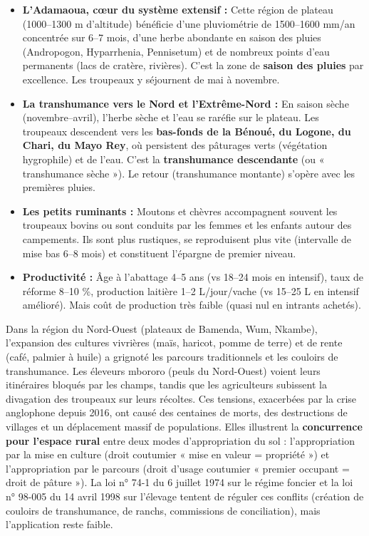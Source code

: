 \documentclass[11pt]{article}
\begin{document}
\begin{itemize}
    \item \textbf{L'Adamaoua, cœur du système extensif :} Cette région de plateau (1000--1300 m d'altitude) bénéficie d'une pluviométrie de 1500--1600 mm/an concentrée sur 6--7 mois, d'une herbe abondante en saison des pluies (Andropogon, Hyparrhenia, Pennisetum) et de nombreux points d'eau permanents (lacs de cratère, rivières). C'est la zone de \textbf{saison des pluies} par excellence. Les troupeaux y séjournent de mai à novembre.
    \item \textbf{La transhumance vers le Nord et l'Extrême-Nord :} En saison sèche (novembre--avril), l'herbe sèche et l'eau se raréfie sur le plateau. Les troupeaux descendent vers les \textbf{bas-fonds de la Bénoué, du Logone, du Chari, du Mayo Rey}, où persistent des pâturages verts (végétation hygrophile) et de l'eau. C'est la \textbf{transhumance descendante} (ou « transhumance sèche »). Le retour (transhumance montante) s'opère avec les premières pluies.
    \item \textbf{Les petits ruminants :} Moutons et chèvres accompagnent souvent les troupeaux bovins ou sont conduits par les femmes et les enfants autour des campements. Ils sont plus rustiques, se reproduisent plus vite (intervalle de mise bas 6--8 mois) et constituent l'épargne de premier niveau.
    \item \textbf{Productivité :} Âge à l'abattage 4--5 ans (vs 18--24 mois en intensif), taux de réforme 8--10 \%, production laitière 1--2 L/jour/vache (vs 15--25 L en intensif amélioré). Mais coût de production très faible (quasi nul en intrants achetés).
\end{itemize}

\begin{savaistu}
Dans la région du Nord-Ouest (plateaux de Bamenda, Wum, Nkambe), l'expansion des cultures vivrières (maïs, haricot, pomme de terre) et de rente (café, palmier à huile) a grignoté les parcours traditionnels et les couloirs de transhumance. Les éleveurs mbororo (peuls du Nord-Ouest) voient leurs itinéraires bloqués par les champs, tandis que les agriculteurs subissent la divagation des troupeaux sur leurs récoltes. Ces tensions, exacerbées par la crise anglophone depuis 2016, ont causé des centaines de morts, des destructions de villages et un déplacement massif de populations. Elles illustrent la \textbf{concurrence pour l'espace rural} entre deux modes d'appropriation du sol : l'appropriation par la mise en culture (droit coutumier « mise en valeur = propriété ») et l'appropriation par le parcours (droit d'usage coutumier « premier occupant = droit de pâture »). La loi n° 74-1 du 6 juillet 1974 sur le régime foncier et la loi n° 98-005 du 14 avril 1998 sur l'élevage tentent de réguler ces conflits (création de couloirs de transhumance, de ranchs, commissions de conciliation), mais l'application reste faible.
\end{savaistu}
\end{document}
